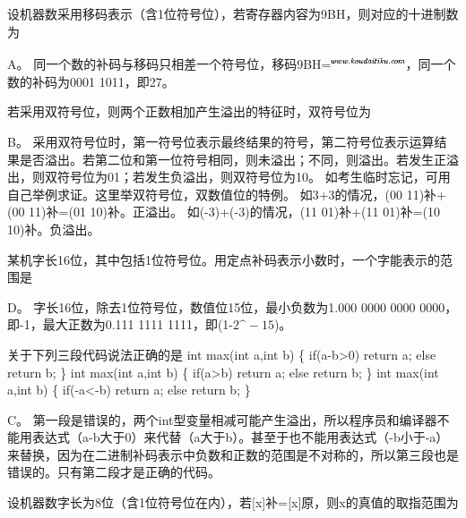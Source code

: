 \question 设机器数采用移码表示（含1位符号位），若寄存器内容为9BH，则对应的十进制数为
\par{}
\begin{solution}A。
同一个数的补码与移码只相差一个符号位，移码9BH=\includegraphics[width=0.86458in,height=0.18750in]{texmath/c89dca5Cdpi7B3507D281001+101129_2}，同一个数的补码为0001
1011，即27。
\end{solution}
\question 若采用双符号位，则两个正数相加产生溢出的特征时，双符号位为
\par{}
\begin{solution}B。
采用双符号位时，第一符号位表示最终结果的符号，第二符号位表示运算结果是否溢出。若第二位和第一位符号相同，则未溢出；不同，则溢出。若发生正溢出，则双符号位为01；若发生负溢出，则双符号位为10。
如考生临时忘记，可用自己举例求证。这里举双符号位，双数值位的特例。
如3+3的情况，(00 11)补+(00 11)补=(01 10)补。正溢出。
如(-3)+(-3)的情况，(11 01)补+(11 01)补=(10 10)补。负溢出。
\end{solution}
\question 某机字长16位，其中包括1位符号位。用定点补码表示小数时，一个字能表示的范围是
\par{}
\begin{solution}D。 字长16位，除去1位符号位，数值位15位，最小负数为1.000 0000 0000
0000，即-1，最大正数为0.111 1111 1111，即(1-$2\^{}-15$)。
\end{solution}
\question 关于下列三段代码说法正确的是 int max(int a,int b) \{
if(a-b\textgreater{}0) return a; else return b; \} int max(int a,int b)
\{ if(a\textgreater{}b) return a; else return b; \} int max(int a,int b)
\{ if(-a\textless{}-b) return a; else return b; \}
\par{}
\begin{solution}C。
第一段是错误的，两个int型变量相减可能产生溢出，所以程序员和编译器不能用表达式（a-b大于0）来代替（a大于b）。甚至于也不能用表达式（-b小于-a）来替换，因为在二进制补码表示中负数和正数的范围是不对称的，所以第三段也是错误的。只有第二段才是正确的代码。
\end{solution}
\question 设机器数字长为8位（含1位符号位在内），若{[}x{]}补={[}x{]}原，则x的真值的取指范围为
\par{}
